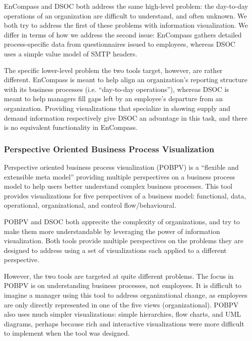 \documentclass[journal]{vgtc}                %
\begin{document}
EnCompass and DSOC both address the same high-level problem: the day-to-day operations of an organization are difficult to understand, and often unknown. We both try to address the first of these problems with information visualization. We differ in terms of how we address the second issue: EnCompass gathers detailed process-specific data from questionnaires issued to employees, whereas DSOC uses a simple value model of SMTP headers.

The specific lower-level problem the two tools target, however, are rather different. EnCompass is meant to help align an organization's reporting structure with its business processes (i.e. ``day-to-day operations''), whereas DSOC is meant to help managers fill gaps left by an employee's departure from an organization. Providing visualizations that specialize in showing supply and demand information respectively give DSOC an advantage in this task, and there is no equivalent functionality in EnCompass.

\subsubsection{Perspective Oriented Business Process Visualization}

Perspective oriented business process visualization (POBPV) is a ``flexible and extensible meta model'' providing multiple perspectives on a business process model to help users better understand complex business processes. This tool provides visualizations for five perspectives of a business model: functional, data, operational, organizational, and control flow/behavioural. 

POBPV and DSOC both apprecite the complexity of organizations, and try to make them more understandable by leveraging the power of information visualization. Both tools provide multiple perspectives on the problems they are designed to address using a set of visualizations each applied to a different perspective.

However, the two tools are targeted at quite different problems. The focus in POBPV is on understanding business processes, not employees. It is difficult to imagine a manager using this tool to address organizational change, as employees are only directly represented in one of the five views (organizational). POBPV also uses much simpler visualizations: simple hierarchies, flow charts, and UML diagrams, perhaps because rich and interactive visualizations were more difficult to implement when the tool was designed. 
\end{document}
